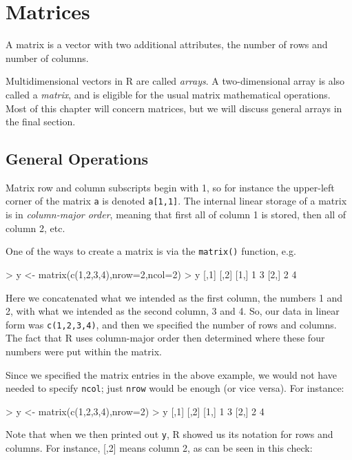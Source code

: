 \chapter{Matrices} 
\label{chap:matrix}

A matrix is a vector with two additional attributes, the number of rows
and number of columns.

Multidimensional vectors in R are called {\it arrays}. A two-dimensional
array is also called a {\it matrix}, and is eligible for the usual
matrix mathematical operations.  Most of this chapter will concern
matrices, but we will discuss general arrays in the final section.

\section{General Operations}

Matrix row and column subscripts begin with 1, so for instance the
upper-left corner of the matrix {\tt a} is denoted {\tt a[1,1]}. The
internal linear storage of a matrix is in {\it column-major order},
meaning that first all of column 1 is stored, then all of column 2, etc.

One of the ways to create a matrix is via the {\tt matrix()} function, e.g.

\begin{Code}
> y <- matrix(c(1,2,3,4),nrow=2,ncol=2)
> y
  [,1] [,2]
[1,] 1    3
[2,] 2    4
\end{Code}

\noindent
Here we concatenated what we intended as the first column, the numbers 1
and 2, with what we intended as the second column, 3 and 4. So, our data
in linear form was {\tt c(1,2,3,4)}, and then we specified the number of
rows and columns. The fact that R uses column-major order then
determined where these four numbers were put within the matrix.

Since we specified the matrix entries in the above example, we would not
have needed to specify {\tt ncol}; just {\tt nrow} would be enough (or
vice versa). For instance:

\begin{Code}
> y <- matrix(c(1,2,3,4),nrow=2)
> y
  [,1] [,2]
[1,] 1    3
[2,] 2    4
\end{Code}

Note that when we then printed out {\tt y}, R showed us its notation for
rows and columns. For instance, [,2] means column 2, as can be seen in
this check:

